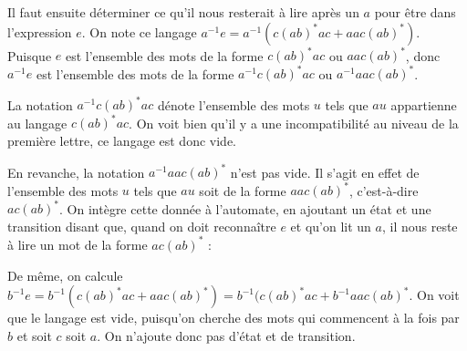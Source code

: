 \begin{example}
Il faut ensuite déterminer ce qu'il nous resterait à lire après un $a$ pour être dans l'expression $e$. On note ce langage $a^{-1}e = a^{-1}(c(ab)^*ac + aac(ab)^*)$.
Puisque $e$ est l'ensemble des mots de la forme $c(ab)^*ac$ ou $aac(ab)^*$, donc $a^{-1}e$ est l'ensemble des mots de la forme $a^{-1}c(ab)^*ac$ ou $a^{-1}aac(ab)^*$.

La notation $a^{-1}c(ab)^*ac$ dénote l'ensemble des mots $u$ tels que $au$ appartienne au langage $c(ab)^*ac$. On voit bien qu'il y a une incompatibilité au niveau de la première lettre, ce langage est donc vide.

En revanche, la notation $a^{-1}aac(ab)^*$ n'est pas vide. Il s'agit en effet de l'ensemble des mots $u$ tels que $au$ soit de la forme $aac(ab)^*$, c'est-à-dire $ac(ab)^*$. On intègre cette donnée à l'automate, en ajoutant un état et une transition disant que, quand on doit reconnaître $e$ et qu'on lit un $a$, il nous reste à lire un mot de la forme $ac(ab)^*$ :



\begin{figure}[H]
\centering

\end{figure}

De même, on calcule $b^{-1}e = b^{-1}(c(ab)^*ac + aac(ab)^*) = b^{-1}(c(ab)^*ac + b^{-1}aac(ab)^*$. On voit que le langage est vide, puisqu'on cherche des mots qui commencent à la fois par $b$ et soit $c$ soit $a$. On n'ajoute donc pas d'état et de transition.


\end{example}
